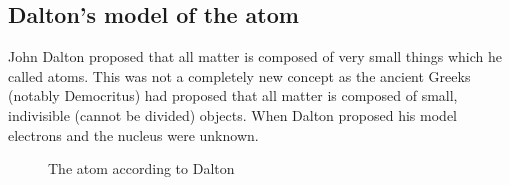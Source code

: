 \subsection*{Dalton's model of the atom}
\begin{minipage}{.5\textwidth}
John Dalton proposed that all matter is composed of very small things which he called atoms. This was not a completely new concept as the ancient Greeks (notably Democritus) had proposed that all matter is composed of small, indivisible (cannot be divided) objects. When Dalton proposed his model electrons and the nucleus were unknown.  
\end{minipage}
\begin{minipage}{.5\textwidth}
	\begin{figure}[H] %
    \begin{center}
\caption{The atom according to Dalton}
\end{center}
 \end{figure}
\end{minipage}

      \label{m38756*uid1}
